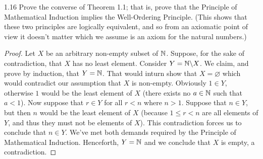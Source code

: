 \begin{exercise}{1.16}
    Prove the converse of Theorem 1.1; that is, prove that the Principle of Mathematical Induction implies the Well-Ordering Principle.
    (This shows that these two principles are logically equivalent, and so from an axiomatic point of view it doesn't matter which we assume is an axiom for the natural numbers.)
\end{exercise}
\begin{proof}
    Let \(X\) be an arbitrary non-empty subset of \(\mathbb{N}\). Suppose, for the sake of contradiction, that \(X\) has no least element.
    Consider \(Y = \mathbb{N} \backslash X\). We claim, and prove by induction, that \(Y = \mathbb{N}\). That would inturn show that \(X = \varnothing\) which would contradict our assumption that \(X\) is non-empty.
    Obviously \(1 \in Y\), otherwise \(1\) would be the least element of \(X\) (there exists no \(a \in \mathbb{N}\) such that \(a < 1\)). Now suppose that \(r \in Y\) for all \(r < n\) where \(n > 1\).
    Suppose that \(n \in Y\), but then \(n\) would be the least element of \(X\) (because \(1 \leq r < n\) are all elements of \(Y\), and thus they must not be elements of \(X\)). This contradiction forces
    us to conclude that \(n \in Y\). We've met both demands required by the Principle of Mathematical Induction. Henceforth, \(Y = \mathbb{N}\) and we conclude that \(X\) is empty, a contradiction.
\end{proof}

